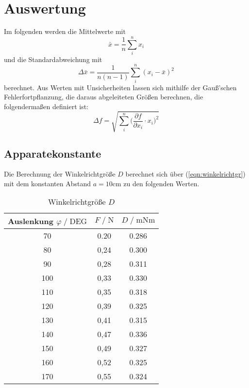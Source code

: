 \section{Auswertung}
\label{sec:Auswertung}

Im folgenden werden die Mittelwerte mit
\begin{equation}
  \label{eqn:mittelwert}
  \bar x = \frac 1n \sum_i^n x_i
\end{equation}
und die Standardabweichung mit
\begin{equation}
  \label{eqn:stdabweichung}
  \Delta\bar x = \frac{1}{n(n-1)}\sum_i^n (x_i- \bar x)^2
\end{equation}
berechnet.
Aus Werten mit Unsicherheiten lassen sich mithilfe der Gauß'schen Fehlerfortpflanzung, die daraus abgeleiteten Größen berechnen, die
folgendermaßen definiert ist:
\begin{equation}
  \label{eqn:gauß}
  \Delta f= \sqrt{\sum_i^n \Big(\frac{\partial f}{\partial x_i}\cdot x_i \Big)^2}
\end{equation}


\subsection{Apparatekonstante}
\label{sec:Apparatekonstante}
Die Berechnung der Winkelrichtgröße $D$ berechnet sich über (\autoref{eqn:winkelrichtgr}) mit dem konstanten Abstand 
$a= 10\si{\centi\meter}$ zu den folgenden Werten.

\begin{table}
  \centering
  \caption{Winkelrichtgröße $D$}
  \label{tab:winkelrichtgroesse}
  \begin{tabular}{c c c}
      \toprule
      Auslenkung $ \varphi \;/\; \text{DEG}$ & $F \;/\; \si{\newton}$ & $D \;/\; \si{\milli\newton\meter}$\\
      \midrule
      70 & 0.20 & 0.286 \\
      80 & 0,24 & 0.300 \\
      90 & 0,28 & 0.311 \\
      100 & 0,33 & 0.330 \\
      110 & 0,35 & 0.318 \\
      120 & 0,39 & 0.325 \\ 
      130 & 0,41 & 0.315 \\
      140 & 0,47 & 0.336 \\
      150 & 0,49 & 0.327 \\
      160 & 0,52 & 0.325 \\
      170 & 0,55 & 0.324 \\
      \bottomrule
  \end{tabular}
\end{table}

